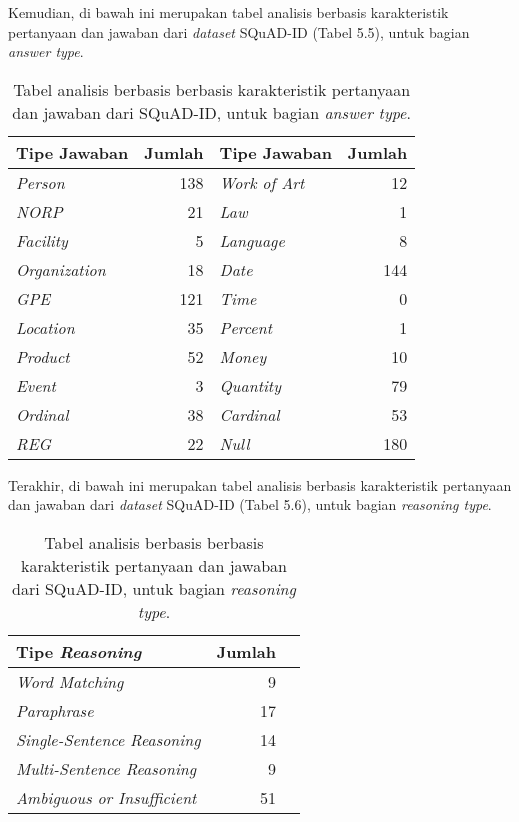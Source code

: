Kemudian, di bawah ini merupakan tabel analisis berbasis karakteristik pertanyaan dan jawaban dari \emph{dataset} SQuAD-ID (Tabel 5.5), untuk bagian \emph{answer type}.

\begin{table}[H]\centering
\begin{tabular}{lr|lr}
\toprule
Tipe Jawaban & Jumlah & Tipe Jawaban & Jumlah \\
\midrule
\emph{Person} & 138 & \emph{Work of Art} & 12 \\
\emph{NORP} & 21 & \emph{Law} & 1 \\
\emph{Facility} & 5 & \emph{Language} & 8 \\
\emph{Organization} & 18 & \emph{Date} & 144 \\
\emph{GPE} & 121 & \emph{Time} & 0 \\
\emph{Location} & 35 & \emph{Percent} & 1 \\
\emph{Product} & 52 & \emph{Money} & 10 \\
\emph{Event} & 3 & \emph{Quantity} & 79 \\
\emph{Ordinal} & 38 & \emph{Cardinal} & 53 \\
\emph{REG} & 22 & \emph{Null} & 180 \\
\bottomrule
\end{tabular}
\caption{Tabel analisis berbasis berbasis karakteristik pertanyaan dan jawaban dari SQuAD-ID, untuk bagian \emph{answer type}.}
\end{table}

Terakhir, di bawah ini merupakan tabel analisis berbasis karakteristik pertanyaan dan jawaban dari \emph{dataset} SQuAD-ID (Tabel 5.6), untuk bagian \emph{reasoning type}.

\begin{table}[H]\centering
\begin{tabular}{lrr}\toprule
Tipe \emph{Reasoning} &Jumlah \\\midrule
\emph{Word Matching} & 9\\
\emph{Paraphrase} & 17\\
\emph{Single-Sentence Reasoning} & 14\\
\emph{Multi-Sentence Reasoning} & 9\\
\emph{Ambiguous or Insufficient} & 51\\
\bottomrule
\end{tabular}
\caption{Tabel analisis berbasis berbasis karakteristik pertanyaan dan jawaban dari SQuAD-ID, untuk bagian \emph{reasoning type}.}
\end{table}

